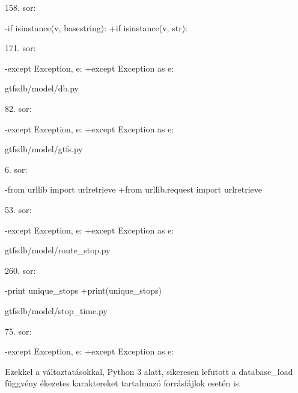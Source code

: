 158. sor:
\begin{python}
-if isinstance(v, basestring):
+if isinstance(v, str):
\end{python}

171. sor:
\begin{python}
-except Exception, e:
+except Exception as e:
\end{python}

gtfsdb/model/db.py

82. sor:
\begin{python}
-except Exception, e:
+except Exception as e:
\end{python}

gtfsdb/model/gtfs.py

6. sor:
\begin{python}
-from urllib import urlretrieve
+from urllib.request import urlretrieve
\end{python}

53. sor:
\begin{python}
-except Exception, e:
+except Exception as e:
\end{python}

gtfsdb/model/route\_stop.py

260. sor:
\begin{python}
-print unique_stops
+print(unique_stops)
\end{python}

gtfsdb/model/stop\_time.py

75. sor:
\begin{python}
-except Exception, e:
+except Exception as e:
\end{python}

Ezekkel a változtatásokkal, Python 3 alatt, sikeresen lefutott a database\_load függvény ékezetes karaktereket tartalmazó forrásfájlok esetén is.

